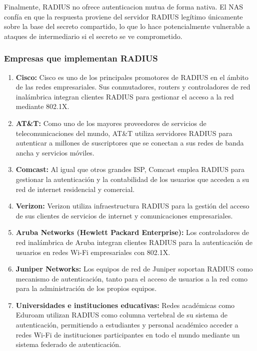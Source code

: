 \documentclass[letterpaper,12pt]{article}
\begin{document}
Finalmente, RADIUS no ofrece autenticacion mutua de forma nativa. 
El NAS conf\'ia en que la respuesta proviene del servidor RADIUS leg\'itimo \'unicamente sobre la 
base del secreto compartido, lo que lo hace potencialmente vulnerable a ataques de intermediario si el secreto
 se ve comprometido.

\subsubsection{Empresas que implementan RADIUS}


\begin{enumerate}[leftmargin=2cm]
  \item \textbf{Cisco:} Cisco es uno de los principales promotores de RADIUS en el \'ambito de las redes empresariales. Sus conmutadores, routers y controladores de red inal\'ambrica integran clientes RADIUS para gestionar el acceso a la red mediante 802.1X.

  \item \textbf{AT\&T:} Como uno de los mayores proveedores de servicios de telecomunicaciones del mundo, AT\&T utiliza servidores RADIUS para autenticar a millones de suscriptores que se conectan a sus redes de banda ancha y servicios m\'oviles.

  \item \textbf{Comcast:} Al igual que otros grandes ISP, Comcast emplea RADIUS para gestionar la autenticaci\'on y la contabilidad de los usuarios que acceden a su red de internet residencial y comercial.

  \item \textbf{Verizon:} Verizon utiliza infraestructura RADIUS para la gesti\'on del acceso de sus clientes de servicios de internet y comunicaciones empresariales.

  \item \textbf{Aruba Networks (Hewlett Packard Enterprise):} Los controladores de red inal\'ambrica de Aruba integran clientes RADIUS para la autenticaci\'on de usuarios en redes Wi-Fi empresariales con 802.1X.

  \item \textbf{Juniper Networks:} Los equipos de red de Juniper soportan RADIUS como mecanismo de autenticaci\'on, tanto para el acceso de usuarios a la red como para la administraci\'on de los propios equipos.

  \item \textbf{Universidades e instituciones educativas:} Redes acad\'emicas como Eduroam utilizan RADIUS como columna vertebral de su sistema de autenticaci\'on, permitiendo a estudiantes y personal acad\'emico acceder a redes Wi-Fi de instituciones participantes en todo el mundo mediante un sistema federado de autenticaci\'on.


\end{enumerate}
\end{document}

